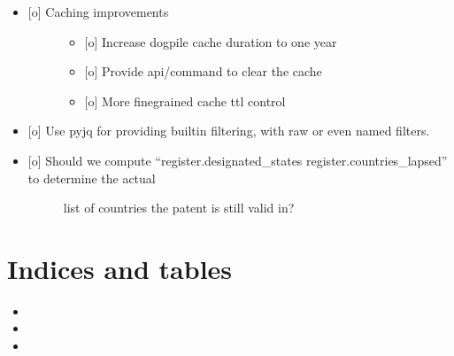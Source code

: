 \documentclass[letterpaper,10pt,english]{sphinxmanual}
\begin{document}
\begin{itemize}
\begin{description}
\end{description}

\item {} \begin{description}
\item[{{[}o{]} Caching improvements}] \leavevmode\begin{itemize}
\item {} 
{[}o{]} Increase dogpile cache duration to one year

\item {} 
{[}o{]} Provide api/command to clear the cache

\item {} 
{[}o{]} More fine\sphinxhyphen{}grained cache ttl control

\end{itemize}

\end{description}

\item {} \begin{description}
\item[{{[}o{]} Use pyjq for providing built\sphinxhyphen{}in filtering, with raw or even named filters.}] \leavevmode
{}

\end{description}

\item {} \begin{description}
\item[{{[}o{]} Should we compute “register.designated\_states \sphinxhyphen{} register.countries\_lapsed” to determine the actual}] \leavevmode
list of countries the patent is still valid in?

\end{description}

\end{itemize}


\section{Indices and tables}
\label{\detokenize{index:indices-and-tables}}\begin{itemize}
\item {} 

\item {} 

\item {} 

\end{itemize}



\renewcommand{\indexname}{Index}
\printindex
\end{document}
